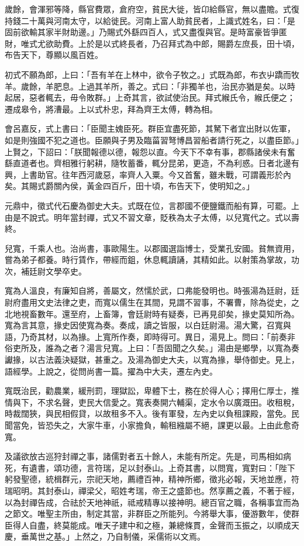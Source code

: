 \begin{pinyinscope}
歲餘，會渾邪等降，縣官費眾，倉府空，貧民大徙，皆卬給縣官，無以盡贍。式復持錢二十萬與河南太守，以給徙民。河南上富人助貧民者，上識式姓名，曰：「是固前欲輸其家半財助邊。」乃賜式外繇四百人，式又盡復與官。是時富豪皆爭匿財，唯式尤欲助費。上於是以式終長者，乃召拜式為中郎，賜爵左庶長，田十頃，布告天下，尊顯以風百姓。

初式不願為郎，上曰：「吾有羊在上林中，欲令子牧之。」式既為郎，布衣屮蹻而牧羊。歲餘，羊肥息。上過其羊所，善之。式曰：「非獨羊也，治民亦猶是矣。以時起居，惡者輒去，毋令敗群。」上奇其言，欲試使治民。拜式緱氏令，緱氏便之；遷成皋令，將漕最。上以式朴忠，拜為齊王太傅，轉為相。

會呂嘉反，式上書曰：「臣聞主媿臣死。群臣宜盡死節，其駑下者宜出財以佐軍，如是則強國不犯之道也。臣願與子男及臨菑習弩博昌習船者請行死之，以盡臣節。」上賢之，下詔曰：「朕聞報德以德，報怨以直。今天下不幸有事，郡縣諸侯未有奮繇直道者也。齊相雅行躬耕，隨牧蓄番，輒分昆弟，更造，不為利惑。日者北邊有興，上書助官。往年西河歲惡，率齊人入粟。今又首奮，雖未戰，可謂義形於內矣。其賜式爵關內侯，黃金四百斤，田十頃，布告天下，使明知之。」

元鼎中，徵式代石慶為御史大夫。式既在位，言郡國不便鹽鐵而船有算，可罷。上由是不說式。明年當封禪，式又不習文章，貶秩為太子太傅，以兒寬代之。式以壽終。

兒寬，千乘人也。治尚書，事歐陽生。以郡國選詣博士，受業孔安國。貧無資用，嘗為弟子都養。時行賃作，帶經而鉏，休息輒讀誦，其精如此。以射策為掌故，功次，補廷尉文學卒史。

寬為人溫良，有廉知自將，善屬文，然懦於武，口弗能發明也。時張湯為廷尉，廷尉府盡用文史法律之吏，而寬以儒生在其間，見謂不習事，不署曹，除為從史，之北地視畜數年。還至府，上畜簿，會廷尉時有疑奏，已再見卻矣，掾史莫知所為。寬為言其意，掾史因使寬為奏。奏成，讀之皆服，以白廷尉湯。湯大驚，召寬與語，乃奇其材，以為掾。上寬所作奏，即時得可。異日，湯見上。問曰：「前奏非俗吏所及，誰為之者？湯言兒寬。上曰：「吾固聞之久矣。」湯由是鄉學，以寬為奏讞掾，以古法義決疑獄，甚重之。及湯為御史大夫，以寬為掾，舉侍御史。見上，語經學。上說之，從問尚書一篇。擢為中大夫，遷左內史。

寬既治民，勸農業，緩刑罰，理獄訟，卑體下士，務在於得人心；擇用仁厚士，推情與下，不求名聲，吏民大信愛之。寬表奏開六輔渠，定水令以廣溉田。收租稅，時裁闊狹，與民相假貸，以故租多不入。後有軍發，左內史以負租課殿，當免。民聞當免，皆恐失之，大家牛車，小家擔負，輸租繈屬不絕，課更以最。上由此愈奇寬。

及議欲放古巡狩封禪之事，諸儒對者五十餘人，未能有所定。先是，司馬相如病死，有遺書，頌功德，言符瑞，足以封泰山。上奇其書，以問寬，寬對曰：「陛下躬發聖德，統楫群元，宗祀天地，薦禮百神，精神所鄉，徵兆必報，天地並應，符瑞昭明。其封泰山，禪梁父，昭姓考瑞，帝王之盛節也。然享薦之義，不著于經，以為封禪告成，合祛於天地神祇，祗戒精專以接神明。總百官之職，各稱事宜而為之節文。唯聖主所由，制定其當，非群臣之所能列。今將舉大事，優游數年，使群臣得人自盡，終莫能成。唯天子建中和之極，兼總條貫，金聲而玉振之，以順成天慶，垂萬世之基。」上然之，乃自制儀，采儒術以文焉。


\end{pinyinscope}

